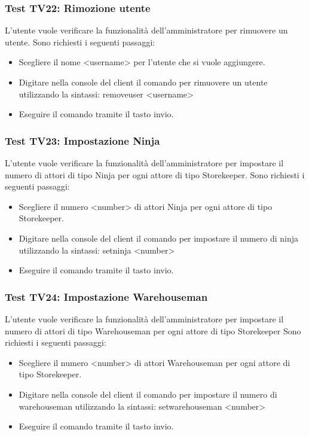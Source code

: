 \documentclass[a4paper]{article}
\begin{document}
		\subsubsection{Test TV22: Rimozione utente}
		L'utente vuole verificare la funzionalità dell'amministratore per rimuovere un utente.
		Sono richiesti i seguenti passaggi:
		\begin{itemize}
			\item Scegliere il nome <username> per l'utente che si vuole aggiungere.
			\item Digitare nella console del client il comando per rimuovere un utente utilizzando la sintassi: removeuser <username>
			\item Eseguire il comando tramite il tasto invio.
		\end{itemize}
		
		\subsubsection{Test TV23: Impostazione Ninja}
		L'utente vuole verificare la funzionalità dell'amministratore per impostare il numero di attori di tipo Ninja per ogni attore di tipo Storekeeper.
		Sono richiesti i seguenti passaggi:
		\begin{itemize}
			\item Scegliere il numero <number> di attori Ninja per ogni attore di tipo Storekeeper.
			\item Digitare nella console del client il comando per impostare il numero di ninja utilizzando la sintassi: setninja <number>
			\item Eseguire il comando tramite il tasto invio.
		\end{itemize}
		
		\subsubsection{Test TV24: Impostazione Warehouseman}
		L'utente vuole verificare la funzionalità dell'amministratore per impostare il numero di attori di tipo Warehouseman per ogni attore di tipo Storekeeper
		Sono richiesti i seguenti passaggi:
		\begin{itemize}
			\item Scegliere il numero <number> di attori Warehouseman per ogni attore di tipo Storekeeper.
			\item Digitare nella console del client il comando per impostare il numero di warehouseman utilizzando la sintassi: setwarehouseman <number>
			\item Eseguire il comando tramite il tasto invio.
		\end{itemize}
		
\end{document}

